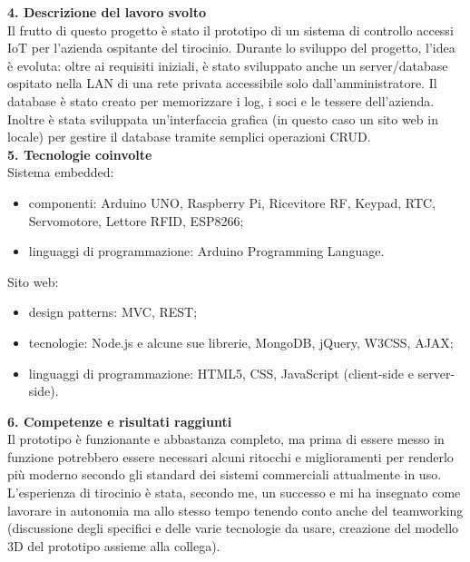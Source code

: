 \documentclass[11pt]{article}
\begin{document}
	\noindent\textbf{\large 4. Descrizione del lavoro svolto} \\
	\newline 
	Il frutto di questo progetto è stato il prototipo di un sistema di controllo accessi IoT \cite{IoT,smart_objects, controllo_accessi} per l'azienda ospitante del tirocinio. Durante lo sviluppo del progetto, l'idea è evoluta: oltre ai requisiti iniziali, è stato sviluppato anche un server/database ospitato nella LAN di una rete privata accessibile solo dall'amministratore. Il database è stato creato per memorizzare i log, i soci e le tessere dell'azienda. Inoltre è stata sviluppata un'interfaccia grafica (in questo caso un sito web in locale) per gestire il database tramite semplici operazioni CRUD. \\
	\newline
	\noindent\textbf{\large 5. Tecnologie coinvolte} \\
	\newline 
	Sistema embedded: 
	\begin{itemize}
		\item componenti: Arduino UNO\cite{sistemi_embedded_atrent}, Raspberry Pi, Ricevitore RF, Keypad, RTC, Servomotore, Lettore RFID, ESP8266\cite{esp_ds}; 
		\item linguaggi di programmazione: Arduino Programming Language.
	\end{itemize} 
	\pagebreak
	\noindent Sito web:
	\begin{itemize}
		\item design patterns: MVC, REST;
		\item tecnologie: Node.js e alcune sue librerie, MongoDB\cite{mongodb_driver, mongoose}, jQuery, W3CSS, AJAX;
		\item linguaggi di programmazione: HTML5, CSS, JavaScript (client-side e server-side).
		\\
	\end{itemize}
	\noindent\textbf{\large 6. Competenze e risultati raggiunti} \\
	\newline 
	\noindent Il prototipo è funzionante e abbastanza completo, ma prima di essere messo in funzione potrebbero essere necessari
	alcuni ritocchi e miglioramenti per renderlo più moderno secondo gli standard dei sistemi commerciali attualmente in uso.
	\newline
	L'esperienza di tirocinio è stata, secondo me, un successo e mi ha insegnato come lavorare in autonomia ma allo stesso tempo tenendo conto anche del teamworking (discussione degli specifici e delle varie tecnologie da usare, creazione del modello 3D del prototipo assieme alla collega).
	\newline
	
\end{document}
